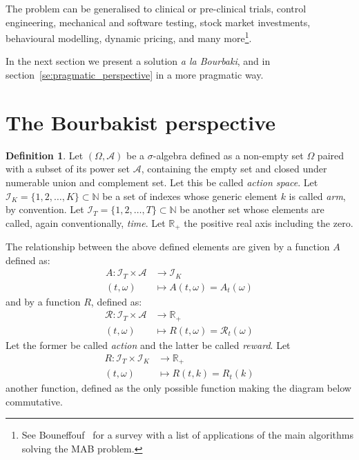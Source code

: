 \documentclass[]{scrartcl}
\theoremstyle{definition}
\newtheorem{definition}{Definition}[section]
\begin{document}
The problem can be generalised to clinical or pre-clinical trials, control engineering, mechanical and software testing, stock market investments, behavioural modelling, dynamic pricing, and many more\footnote{See Bouneffouf~\cite{bf2019survey} for a survey with a list of applications of the main algorithms solving the MAB problem.}.

In the next section we present a solution \emph{a la Bourbaki}, and in section~\ref{se:pragmatic_perspective} in a more pragmatic way.

\section{The Bourbakist perspective}
\label{se:bourbaki_perspective}

\begin{definition}
    Let $(\Omega, \mathcal{A})$ be a $\sigma$-algebra defined as a non-empty set $\Omega$ paired with a subset of its power set $\mathcal{A}$, containing the empty set and closed under numerable union and complement set. Let this be called \emph{action space}. Let $\mathcal{I}_{K} = \{1,2, \dots , K\} \subset \mathbb{N}$ be a set of indexes whose generic element $k$ is called \emph{arm}, by convention. Let $\mathcal{I}_{T} = \{1,2, \dots , T\} \subset \mathbb{N}$ be another set whose elements are called, again conventionally, \emph{time}. Let $\mathbb{R}_{+}$ the positive real axis including the zero. 
\end{definition}

The relationship between the above defined elements are given by a function $A$ defined as:
\begin{align*}
    A : \mathcal{I}_T \times \mathcal{A} &\longrightarrow \mathcal{I}_K \\
        (t, \omega) &\longmapsto A(t, \omega) = A_t(\omega)
\end{align*}
and by a function $R$, defined as:
\begin{align*}
\mathcal{R} : \mathcal{I}_T \times \mathcal{A} &\longrightarrow \mathbb{R}_{+} \\
(t, \omega) &\longmapsto R(t, \omega) = \mathcal{R}_t(\omega)
\end{align*}
Let the former be called \emph{action} and the latter be called \emph{reward}. Let 
\begin{align*}
R : \mathcal{I}_T \times \mathcal{I}_K &\longrightarrow \mathbb{R}_{+} \\
(t, \omega) &\longmapsto R(t, k) = R_t(k)
\end{align*}
another function, defined as the only possible function making the diagram below commutative.
\end{document}
